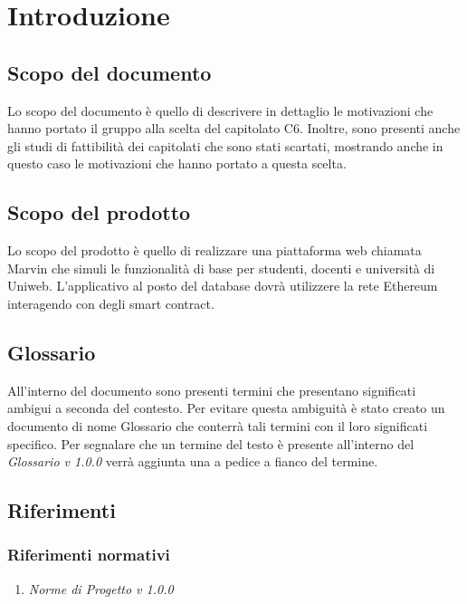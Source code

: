 \documentclass[StudioDiFattibilità.tex]{subfiles}
\begin{document}
\chapter{Introduzione}
\section{Scopo del documento}
Lo scopo del documento è quello di descrivere in dettaglio le motivazioni che hanno portato il gruppo alla scelta del capitolato C6. Inoltre, sono presenti anche gli studi di fattibilità dei capitolati che sono stati scartati, mostrando anche in questo caso le motivazioni che hanno portato a questa scelta.
\section{Scopo del prodotto}
Lo scopo del prodotto è quello di realizzare una piattaforma web chiamata Marvin che simuli le funzionalità di base per studenti, docenti e università di Uniweb. L'applicativo al posto del database dovrà utilizzere la rete Ethereum interagendo con degli smart contract.
\section{Glossario}
All'interno del documento sono presenti termini che presentano significati ambigui a seconda del contesto. Per evitare questa ambiguità è stato creato un documento di nome Glossario che conterrà tali termini con il loro significati specifico. Per segnalare che un termine del testo è presente all'interno del \textit{Glossario v 1.0.0} verrà aggiunta una \Glossario{} a pedice a fianco del termine.
\section{Riferimenti}
\subsection{Riferimenti normativi}
\begin{enumerate}
	\item \textit{Norme di Progetto v 1.0.0}
\end{enumerate}
\end{document}
